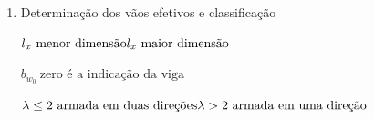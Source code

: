 \begin{resposta}
    \begin{enumerate}
        \item Determinação dos vãos efetivos e classificação

        \begin{observacao}
            \begin{math}
                l_x \ \text{menor dimensão} \newline
                l_x \ \text{maior dimensão}
            \end{math}
        \end{observacao}

        \begin{observacao}
            \begin{math}
            b_{w_0} \ \text{zero é a indicação da viga}
            \end{math}
        \end{observacao}

        \begin{observacao}
            \begin{math}
                \lambda \leq 2 \ \text{armada em duas direções} \newline
                \lambda > 2 \ \text{armada em uma direção}
            \end{math}
        \end{observacao}


        

        \begin{enumerate}
        
\end{enumerate}
\end{enumerate}
\end{resposta}
